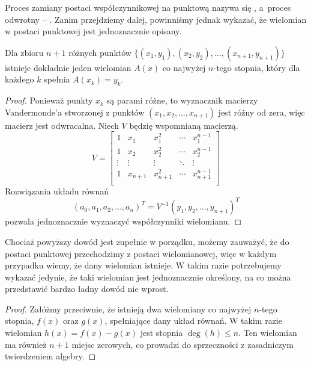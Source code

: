 \documentclass[11pt]{scrartcl}
\begin{document}
    Proces zamiany postaci współczynnikowej na punktową nazywa się , a~proces odwrotny -- . Zanim przejdziemy dalej, powinniśmy jednak wykazać, że wielomian w postaci punktowej jest jednoznacznie opisany.
    \begin{theorem}
        \label{t:polynomial_interpolation}
        Dla zbioru $n + 1$ różnych punktów $\{(x_1, y_1), (x_2, y_2), \ldots, (x_{n+1}, y_{n+1})\}$ istnieje dokładnie jeden wielomian $A(x)$ co najwyżej $n$-tego stopnia, który dla każdego $k$ spełnia $A(x_k) = y_k$.
    \end{theorem}
    \begin{proof}
        Ponieważ punkty $x_k$ są parami różne, to wyznacznik macierzy Vandermonde'a stworzonej z punktów $(x_1, x_2, \ldots, x_{n+1})$ jest różny od zera, więc macierz jest odwracalna. Niech $V$ będzię wspomnianą macierzą.
        $$ V = \begin{bmatrix}
            1 & x_1 & x_1^2  & \cdots & x_1^{n-1} \\
            1 & x_2 & x_2^2  & \cdots & x_2^{n-1} \\
            \vdots & \vdots  & \vdots & \ddots & \vdots    \\
            1 & x_{n+1} & x_{n+1}^2  & \cdots & x_{n+1}^{n-1} \\
        \end{bmatrix} $$
        Rozwiązania układu równań
        $$ (a_0, a_1, a_2, \ldots, a_n)^T = V^{-1}(y_1, y_2, \ldots, y_{n+1})^T $$
        pozwala jednoznacznie wyznaczyć współczynniki wielomianu.
    \end{proof}

    Chociaż powyższy dowód jest zupełnie w porządku, możemy zauważyć, że do postaci punktowej przechodzimy z postaci wielomianowej, więc w każdym przypadku wiemy, że dany wielomian istnieje. W takim razie potrzebujemy wykazać jedynie, że taki wielomian jest jednoznacznie określony, na co można przedstawić bardzo ładny dowód nie wprost.

    \begin{proof}
        Załóżmy przeciwnie, że istnieją dwa wielomiany co najwyżej $n$-tego stopnia, $f(x)$ oraz $g(x)$, spełniające dany układ równań. W takim razie wielomian $h(x) = f(x) - g(x)$ jest stopnia $\deg(h) \leq n$. Ten wielomian ma również $n + 1$ miejsc zerowych, co prowadzi do sprzeczności z zasadniczym twierdzeniem algebry.
    \end{proof}
\end{document}
